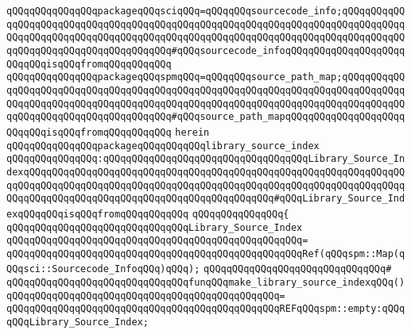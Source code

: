 \verb|qQQqqQQqqQQqqQQqpackageqQQqsciqQQq=qQQqqQQqsourcecode_info;qQQqqQQqqQQqqQQqqQQqqQQqqQQqqQQqqQQqqQQqqQQqqQQqqQQqqQQqqQQqqQQqqQQqqQQqqQQqqQQqqQQqqQQqqQQqqQQqqQQqqQQqqQQqqQQqqQQqqQQqqQQqqQQqqQQqqQQqqQQqqQQqqQQqqQQqqQQqqQQqqQQqqQQqqQQqqQQqqQQq#qQQqsourcecode_infoqQQqqQQqqQQqqQQqqQQqqQQqqQQqisqQQqfromqQQqqQQqqQQq|\newline
\verb|qQQqqQQqqQQqqQQqpackageqQQqspmqQQq=qQQqqQQqsource_path_map;qQQqqQQqqQQqqQQqqQQqqQQqqQQqqQQqqQQqqQQqqQQqqQQqqQQqqQQqqQQqqQQqqQQqqQQqqQQqqQQqqQQqqQQqqQQqqQQqqQQqqQQqqQQqqQQqqQQqqQQqqQQqqQQqqQQqqQQqqQQqqQQqqQQqqQQqqQQqqQQqqQQqqQQqqQQqqQQqqQQq#qQQqsource_path_mapqQQqqQQqqQQqqQQqqQQqqQQqqQQqisqQQqfromqQQqqQQqqQQq|\newline
\verb|herein|\newline
\newline
\verb|qQQqqQQqqQQqqQQqpackageqQQqqQQqqQQqlibrary_source_index|\newline
\verb|qQQqqQQqqQQqqQQq:qQQqqQQqqQQqqQQqqQQqqQQqqQQqqQQqqQQqLibrary_Source_IndexqQQqqQQqqQQqqQQqqQQqqQQqqQQqqQQqqQQqqQQqqQQqqQQqqQQqqQQqqQQqqQQqqQQqqQQqqQQqqQQqqQQqqQQqqQQqqQQqqQQqqQQqqQQqqQQqqQQqqQQqqQQqqQQqqQQqqQQqqQQqqQQqqQQqqQQqqQQqqQQqqQQqqQQqqQQqqQQqqQQqqQQq#qQQqLibrary_Source_IndexqQQqqQQqisqQQqfromqQQqqQQqqQQq|\newline
\verb|qQQqqQQqqQQqqQQq{|\newline
\verb|qQQqqQQqqQQqqQQqqQQqqQQqqQQqqQQqLibrary_Source_Index|\newline
\verb|qQQqqQQqqQQqqQQqqQQqqQQqqQQqqQQqqQQqqQQqqQQqqQQqqQQq=|\newline
\verb|qQQqqQQqqQQqqQQqqQQqqQQqqQQqqQQqqQQqqQQqqQQqqQQqqQQqRef(qQQqspm::Map(qQQqsci::Sourcecode_InfoqQQq)qQQq);|\newline
\newline
\verb|qQQqqQQqqQQqqQQqqQQqqQQqqQQqqQQq#|\newline
\verb|qQQqqQQqqQQqqQQqqQQqqQQqqQQqqQQqfunqQQqmake_library_source_indexqQQq()|\newline
\verb|qQQqqQQqqQQqqQQqqQQqqQQqqQQqqQQqqQQqqQQqqQQqqQQq=|\newline
\verb|qQQqqQQqqQQqqQQqqQQqqQQqqQQqqQQqqQQqqQQqqQQqqQQqREFqQQqspm::empty:qQQqqQQqLibrary_Source_Index;|\newline
